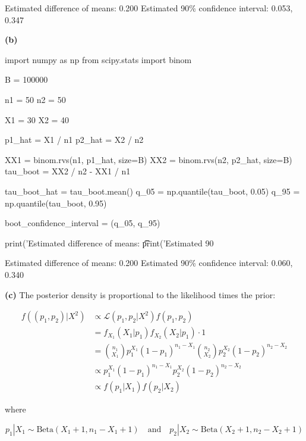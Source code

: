\begin{console}
Estimated difference of means:           0.200
Estimated 90\% confidence interval:       0.053, 0.347
\end{console}

\textbf{(b)}

\begin{python}
import numpy as np
from scipy.stats import binom

B = 100000

n1 = 50
n2 = 50

X1 = 30
X2 = 40

p1_hat = X1 / n1
p2_hat = X2 / n2

XX1 = binom.rvs(n1, p1_hat, size=B)
XX2 = binom.rvs(n2, p2_hat, size=B)
tau_boot = XX2 / n2 - XX1 / n1

tau_boot_hat = tau_boot.mean()
q_{0}5 = np.quantile(tau_boot, 0.05)
q_95 = np.quantile(tau_boot, 0.95)

boot_confidence_{i}nterval = (q_{0}5, q_95)

print('Estimated difference of means: \t\t %
print('Estimated 90%
\end{python}

\begin{console}
Estimated difference of means:           0.200
Estimated 90\% confidence interval:       0.060, 0.340
\end{console}

\textbf{(c)} The posterior density is proportional to the likelihood
times the prior:

\begin{align*}
f((p_{1}, p_{2}) | X^{2}) &\propto \mathcal{L}(p_{1}, p_{2} | X^{2}) f(p_{1}, p_{2}) \\
&= f_{X_{1}}(X_{1} | p_{1}) f_{X_{2}}(X_{2} | p_{1}) \cdot 1 \\
&= \binom{n_{1}}{X_{1}} p_{1}^{X_{1}} (1 - p_{1})^{n_{1} - X_{1}} \binom{n_{2}}{X_{2}} p_{2}^{X_{2}} (1 - p_{2})^{n_{2} - X_{2}} \\
&\propto p_{1}^{X_{1}} (1 - p_{1})^{n_{1} - X_{1}} p_{2}^{X_{2}} (1 - p_{2})^{n_{2} - X_{2}} \\
&\propto f(p_{1} | X_{1}) f(p_{2} | X_{2})
\end{align*}

where

\[p_{1} | X_{1} \sim \text{Beta}(X_{1} + 1, n_{1} - X_{1} + 1) 
\quad \text{and} \quad
p_{2} | X_{2} \sim \text{Beta}(X_{2} + 1, n_{2} - X_{2} + 1)\]


